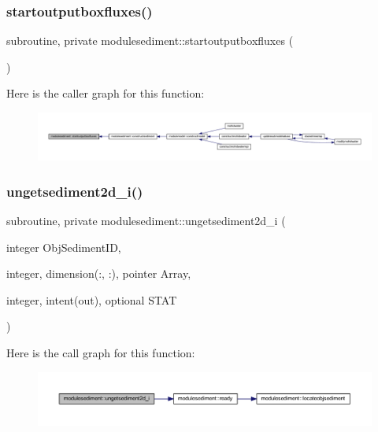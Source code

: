 \subsubsection{\texorpdfstring{startoutputboxfluxes()}{startoutputboxfluxes()}}
{\footnotesize\ttfamily subroutine, private modulesediment\+::startoutputboxfluxes (\begin{DoxyParamCaption}{ }\end{DoxyParamCaption})\hspace{0.3cm}{\ttfamily [private]}}

Here is the caller graph for this function\+:\nopagebreak
\begin{figure}[H]
\begin{center}
\leavevmode
\includegraphics[width=350pt]{namespacemodulesediment_ac07e155e923f9f500063126c9e4f7ede_icgraph}
\end{center}
\end{figure}
\mbox{\label{namespacemodulesediment_a12b3d28230917a2bca4471c82f39bdab}} 
\subsubsection{\texorpdfstring{ungetsediment2d\+\_\+i()}{ungetsediment2d\_i()}}
{\footnotesize\ttfamily subroutine, private modulesediment\+::ungetsediment2d\+\_\+i (\begin{DoxyParamCaption}\item[{integer}]{Obj\+Sediment\+ID,  }\item[{integer, dimension(\+:, \+:), pointer}]{Array,  }\item[{integer, intent(out), optional}]{S\+T\+AT }\end{DoxyParamCaption})\hspace{0.3cm}{\ttfamily [private]}}

Here is the call graph for this function\+:\nopagebreak
\begin{figure}[H]
\begin{center}
\leavevmode
\includegraphics[width=350pt]{namespacemodulesediment_a12b3d28230917a2bca4471c82f39bdab_cgraph}
\end{center}
\end{figure}
\mbox{\label{namespacemodulesediment_af3fda7dbc66fbbecc4cf8ca7d4fdf95d}} 
